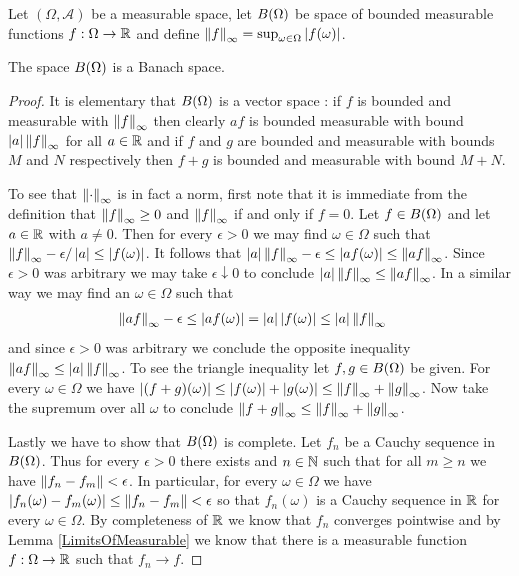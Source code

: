 \begin{defn}Let $(\Omega, \mathcal{A})$ be a measurable space, let $B(\Omega)$ be space of bounded measurable functions $f : \Omega \to \mathbb{R}$ and define $\left \lVert f \right \rVert_\infty = \sup_{\omega \in \Omega} \left \vert f(\omega) \right \vert$.
\end{defn}

\begin{prop}The space $B(\Omega)$ is a Banach space.
\end{prop}
\begin{proof}
It is elementary that $B(\Omega)$ is a vector space : if $f$ is bounded and measurable with $\left \lVert f \right \rVert_\infty$ then clearly $af$ is bounded measurable with bound $\left \vert a \right \vert\left \lVert f \right \rVert_\infty$ for all $a \in \mathbb{R}$ and if $f$ and $g$ are bounded and measurable with bounds $M$ and $N$ respectively then $f+g$ is bounded and measurable with bound $M+N$.

To see that $\left \lVert \cdot \right \rVert_\infty$ is in fact a norm, first note that it is immediate from the definition that $\left \lVert f \right \rVert_\infty \geq 0$ and $\left \lVert f \right \rVert_\infty$ if and only if $f = 0$.  Let $f \in B(\Omega)$ and let $a \in \mathbb{R}$ with $a \neq 0$.  Then for every $\epsilon>0$ we may find $\omega \in \Omega$ such that $\left \lVert f \right \rVert_\infty - \epsilon/\left \vert a \right \vert \leq \left \vert f(\omega) \right \vert$.  It follows that $\left \vert a \right \vert \left \lVert f \right \rVert_\infty - \epsilon \leq \left \vert a f (\omega) \right \vert \leq \left \lVert af \right \rVert_\infty$.  Since $\epsilon >0$  was arbitrary we may take $\epsilon \downarrow 0$ to conclude $\left \vert a \right \vert \left \lVert f \right \rVert_\infty \leq \left \lVert af \right \rVert_\infty$.  In a similar way we may find an $\omega \in \Omega$ such that 
\begin{align*}
\left \lVert af \right \rVert_\infty - \epsilon &\leq \left \vert af(\omega) \right \vert = \left \vert a \right \vert\left \vert f(\omega) \right \vert \leq \left \vert a \right \vert \left \lVert f \right \rVert_\infty
\end{align*}
and since $\epsilon > 0$ was arbitrary we conclude the opposite inequality $\left \lVert af \right \rVert_\infty \leq \left \vert a \right \vert \left \lVert f \right \rVert_\infty$.  To see the triangle inequality let $f, g \in B(\Omega)$ be given.  For every $\omega \in \Omega$ we have $\left \vert (f+g)(\omega) \right \vert \leq \left \vert f(\omega) \right \vert+\left \vert g(\omega) \right \vert \leq \left \lVert f \right \rVert_\infty + \left \lVert g \right \rVert_\infty$.  Now take the supremum over all $\omega$ to conclude $\left \lVert f+g \right \rVert_\infty \leq \left \lVert f \right \rVert_\infty + \left \lVert g \right \rVert_\infty$.

Lastly we have to show that $B(\Omega)$ is complete.  Let $f_n$ be a Cauchy sequence in $B(\Omega)$.  Thus for every $\epsilon > 0$ there exists and $n \in \mathbb{N}$ such that for all $m \geq n$ we have $\left \lVert f_n - f_m \right \rVert < \epsilon$.  In particular, for every $\omega \in \Omega$ we have $\left \vert f_n(\omega) - f_m(\omega) \right \vert \leq \left \lVert f_n - f_m \right \rVert < \epsilon$ so that $f_n(\omega)$ is a Cauchy sequence in $\mathbb{R}$ for every $\omega \in \Omega$.  By completeness of $\mathbb{R}$ we know that $f_n$ converges pointwise and by Lemma \ref{LimitsOfMeasurable} we know that there is a measurable function $f : \Omega \to \mathbb{R}$ such that $f_n \to f$.  


\end{proof}
